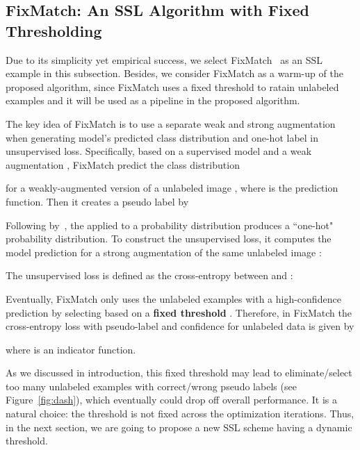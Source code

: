 \documentclass{article}
\begin{document}
\subsection{FixMatch: An SSL Algorithm with Fixed Thresholding} 
Due to its simplicity yet empirical success, we select FixMatch~\citep{sohn2020fixmatch} as an SSL example in this subsection. Besides, we consider FixMatch as a warm-up of the proposed algorithm, since FixMatch uses a fixed threshold to ratain unlabeled examples and it will be used as a pipeline in the proposed algorithm.

The key idea of FixMatch is to use a separate weak and strong augmentation when generating model's predicted class distribution and one-hot label in unsupervised loss. Specifically, based on a supervised model  and a weak augmentation , FixMatch predict the class distribution

for a weakly-augmented version of a unlabeled image , where  is the prediction function. Then it creates a pseudo label by

Following by~\citep{sohn2020fixmatch}, the  applied to a probability distribution produces a ``one-hot" probability distribution. 
To construct the unsupervised loss, it computes the model prediction for a strong augmentation  of the same unlabeled image :

The unsupervised loss is defined as the cross-entropy between  and : 

 Eventually, FixMatch only uses the unlabeled examples with a high-confidence prediction by selecting based on a {\bf fixed threshold} . Therefore, in FixMatch the cross-entropy loss with pseudo-label and confidence for unlabeled data is given by

where  is an indicator function. 

As we discussed in introduction, this fixed threshold may lead to eliminate/select too many unlabeled examples with correct/wrong pseudo labels (see Figure~\ref{fig:dash}), which eventually could drop off overall performance. It is a natural choice: the threshold is not fixed across the optimization iterations. Thus, in the next section, we are going to propose a new SSL scheme having a dynamic threshold. 
\end{document}

